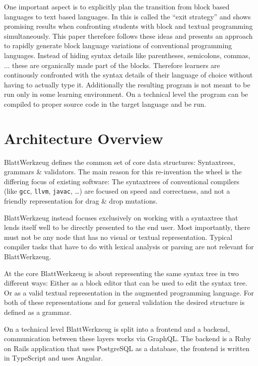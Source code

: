 \documentclass[sigconf,natbib=false,review=true]{acmart}
\begin{document}
One important aspect is to explicitly plan the transition from block based languages to text based languages. In \cite{fraser_ten_2015} this is called the \enquote{exit strategy} and \cite{alrubaye_comparison_2019} shows promising results when confronting students with block and textual programming simultaneously. This paper therefore follows these ideas and presents an approach to rapidly generate block language variations of conventional programming languages. Instead of hiding syntax details like parentheses, semicolons, commas, ... these are organically made part of the blocks. Therefore learners are continously confronted with the syntax details of their language of choice without having to actually type it. Additionally the resulting program is not meant to be run only in some learning environment. On a technical level the program can be compiled to proper source code in the target language and be run.

\section{Architecture Overview}

Blatt\-Werkzeug defines the common set of core data structures: Syntax\-trees, grammars \& validators. The main reason for this re-invention the wheel is the differing focus of existing software: The syntaxtrees of conventional compilers (like \texttt{gcc}, \texttt{llvm}, \texttt{javac}, …) are focused on speed and correctness, and not a friendly representation for drag \& drop mutations.

BlattWerkzeug instead focuses exclusively on working with a syntaxtree that lends itself well to be directly presented to the end user. Most importantly, there must not be any node that has no visual or textual representation. Typical compiler tasks that have to do with lexical analysis or parsing are not relevant for Blatt\-Werkzeug.

At the core Blatt\-Werkzeug is about representing the same syntax tree in two different ways: Either as a block editor that can be used to edit the syntax tree. Or as a valid textual representation in the augmented programming language. For both of these representations and for general validation the desired structure is defined as a grammar.

On a technical level Blatt\-Werkzeug is split into a frontend and a backend, communication between these layers works via GraphQL. The backend is a Ruby on Rails application that uses PostgreSQL as a database, the frontend is written in TypeScript and uses Angular.
\end{document}
